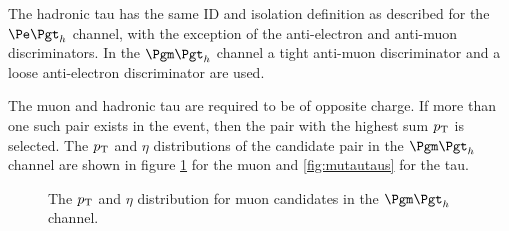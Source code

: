 The hadronic tau has the same ID and isolation definition as described for the $\etau$
channel, with the exception of the anti-electron and anti-muon discriminators.
In the $\mutau$ channel a tight anti-muon discriminator and a loose
anti-electron discriminator are used. 

The muon and hadronic tau are required to be of opposite charge. If more
than one such pair exists in the event, then the pair with the highest sum $p_{\mathrm{T}}$
is selected. The $p_{\mathrm{T}}$ and $\eta$ distributions of the candidate pair in the
$\mutau$ channel are shown in figure \ref{fig:mutaumuons} for the muon and
\ref{fig:mutautaus} for the tau. 


\begin{figure}[htb]
\begin{center}

\end{center}
\caption{
The $p_{\mathrm{T}}$ and $\eta$ distribution for muon candidates in the $\mutau$
channel.
}
\label{fig:mutaumuons}
\end{figure}


